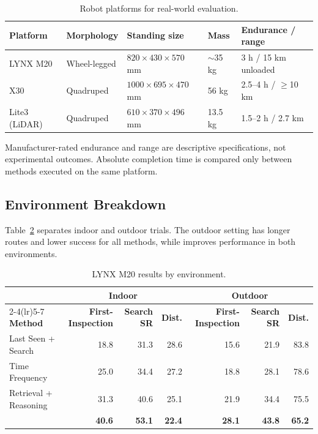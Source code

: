 \begin{table}[H]
\caption{Robot platforms for real-world evaluation.}
\label{tab:robot-platforms}
\centering
\scriptsize
\setlength{\tabcolsep}{8pt}
\begin{tabular}{lllll}
\toprule
\textbf{Platform} & \textbf{Morphology} & \textbf{Standing size} & \textbf{Mass} & \textbf{Endurance / range} \\
\midrule
LYNX M20 & Wheel-legged & $820\times430\times570$ mm & $\sim$35 kg & 3 h / 15 km unloaded \\
X30 & Quadruped & $1000\times695\times470$ mm & 56 kg & 2.5--4 h / $\geq$10 km \\
Lite3 (LiDAR) & Quadruped & $610\times370\times496$ mm & 13.5 kg & 1.5--2 h / 2.7 km \\
\bottomrule
\end{tabular}
\end{table}

Manufacturer-rated endurance and range are descriptive specifications, not
experimental outcomes. Absolute completion time is compared only between
methods executed on the same platform.

\subsection{Environment Breakdown}
\label{app:real-world}

Table~\ref{tab:real-domain} separates indoor and outdoor trials. The outdoor
setting has longer routes and lower success for all methods, while
\evolvingworldnav{} improves performance in both environments.

\begin{table}[H]
\caption{LYNX M20 results by environment.}
\label{tab:real-domain}
\centering
\scriptsize
\setlength{\tabcolsep}{5pt}
\begin{tabular}{lrrrrrr}
\toprule
& \multicolumn{3}{c}{\textbf{Indoor}} & \multicolumn{3}{c}{\textbf{Outdoor}} \\
\cmidrule(lr){2-4}\cmidrule(lr){5-7}
\textbf{Method} & \textbf{First-Inspection} & \textbf{Search SR} & \textbf{Dist.} &
\textbf{First-Inspection} & \textbf{Search SR} & \textbf{Dist.} \\
\midrule
Last Seen + Search & 18.8 & 31.3 & 28.6 & 15.6 & 21.9 & 83.8 \\
Time Frequency & 25.0 & 34.4 & 27.2 & 18.8 & 28.1 & 78.6 \\
Retrieval + Reasoning & 31.3 & 40.6 & 25.1 & 21.9 & 34.4 & 75.5 \\
\textbf{\evolvingworldnav{}} & \textbf{40.6} & \textbf{53.1} & \textbf{22.4}
& \textbf{28.1} & \textbf{43.8} & \textbf{65.2} \\
\bottomrule
\end{tabular}
\end{table}

